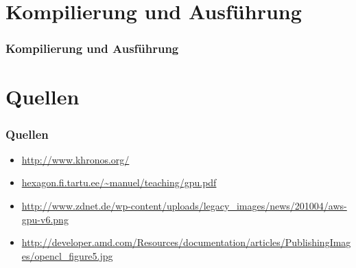 \documentclass{beamer}
\begin{document}
\section{Kompilierung und Ausführung}
\begin{frame}[fragile]
\frametitle{Kompilierung und Ausführung}
\end{frame}

\section{Quellen}
\begin{frame}[fragile]
\frametitle{Quellen}
\begin{itemize}
\item \url{http://www.khronos.org/}
\item \url{hexagon.fi.tartu.ee/~manuel/teaching/gpu.pdf}
\item \url{http://www.zdnet.de/wp-content/uploads/legacy_images/news/201004/aws-gpu-v6.png}
\item \url{http://developer.amd.com/Resources/documentation/articles/PublishingImages/opencl_figure5.jpg}
\end{itemize}
\end{frame}
\end{document}
